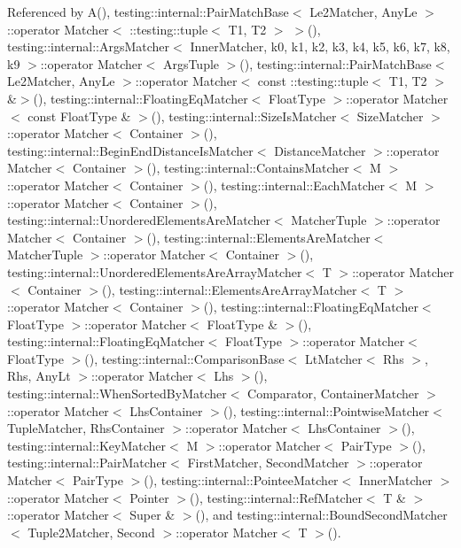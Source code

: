 Referenced by A(), testing\+::internal\+::\+Pair\+Match\+Base$<$ Le2\+Matcher, Any\+Le $>$\+::operator Matcher$<$ \+::testing\+::tuple$<$ T1, T2 $>$ $>$(), testing\+::internal\+::\+Args\+Matcher$<$ Inner\+Matcher, k0, k1, k2, k3, k4, k5, k6, k7, k8, k9 $>$\+::operator Matcher$<$ Args\+Tuple $>$(), testing\+::internal\+::\+Pair\+Match\+Base$<$ Le2\+Matcher, Any\+Le $>$\+::operator Matcher$<$ const \+::testing\+::tuple$<$ T1, T2 $>$ \&$>$(), testing\+::internal\+::\+Floating\+Eq\+Matcher$<$ Float\+Type $>$\+::operator Matcher$<$ const Float\+Type \& $>$(), testing\+::internal\+::\+Size\+Is\+Matcher$<$ Size\+Matcher $>$\+::operator Matcher$<$ Container $>$(), testing\+::internal\+::\+Begin\+End\+Distance\+Is\+Matcher$<$ Distance\+Matcher $>$\+::operator Matcher$<$ Container $>$(), testing\+::internal\+::\+Contains\+Matcher$<$ M $>$\+::operator Matcher$<$ Container $>$(), testing\+::internal\+::\+Each\+Matcher$<$ M $>$\+::operator Matcher$<$ Container $>$(), testing\+::internal\+::\+Unordered\+Elements\+Are\+Matcher$<$ Matcher\+Tuple $>$\+::operator Matcher$<$ Container $>$(), testing\+::internal\+::\+Elements\+Are\+Matcher$<$ Matcher\+Tuple $>$\+::operator Matcher$<$ Container $>$(), testing\+::internal\+::\+Unordered\+Elements\+Are\+Array\+Matcher$<$ T $>$\+::operator Matcher$<$ Container $>$(), testing\+::internal\+::\+Elements\+Are\+Array\+Matcher$<$ T $>$\+::operator Matcher$<$ Container $>$(), testing\+::internal\+::\+Floating\+Eq\+Matcher$<$ Float\+Type $>$\+::operator Matcher$<$ Float\+Type \& $>$(), testing\+::internal\+::\+Floating\+Eq\+Matcher$<$ Float\+Type $>$\+::operator Matcher$<$ Float\+Type $>$(), testing\+::internal\+::\+Comparison\+Base$<$ Lt\+Matcher$<$ Rhs $>$, Rhs, Any\+Lt $>$\+::operator Matcher$<$ Lhs $>$(), testing\+::internal\+::\+When\+Sorted\+By\+Matcher$<$ Comparator, Container\+Matcher $>$\+::operator Matcher$<$ Lhs\+Container $>$(), testing\+::internal\+::\+Pointwise\+Matcher$<$ Tuple\+Matcher, Rhs\+Container $>$\+::operator Matcher$<$ Lhs\+Container $>$(), testing\+::internal\+::\+Key\+Matcher$<$ M $>$\+::operator Matcher$<$ Pair\+Type $>$(), testing\+::internal\+::\+Pair\+Matcher$<$ First\+Matcher, Second\+Matcher $>$\+::operator Matcher$<$ Pair\+Type $>$(), testing\+::internal\+::\+Pointee\+Matcher$<$ Inner\+Matcher $>$\+::operator Matcher$<$ Pointer $>$(), testing\+::internal\+::\+Ref\+Matcher$<$ T \& $>$\+::operator Matcher$<$ Super \& $>$(), and testing\+::internal\+::\+Bound\+Second\+Matcher$<$ Tuple2\+Matcher, Second $>$\+::operator Matcher$<$ T $>$().


